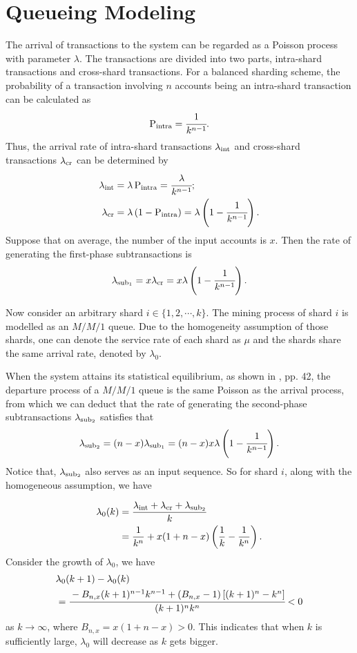 
\section*{Queueing Modeling}

The arrival of transactions to the system can be regarded as a Poisson process with parameter \(\lambda\). 
The transactions are divided into two parts, intra-shard transactions and cross-shard transactions. 
For a balanced sharding scheme, the probability of a transaction involving $n$ accounts being an intra-shard transaction can be calculated as 
\[\operatorname{P}_{\rm intra} = \cfrac{1}{k^{n-1}}.\]
Thus, the arrival rate of intra-shard transactions \(\lambda_{\rm int}\) and cross-shard transactions \(\lambda_{\rm cr}\)
can be determined by 
\begin{align*}
    \lambda_{\rm int} &= \lambda \operatorname{P}_{\rm intra} = \cfrac{\lambda}{k^{n-1}}; \\
    \lambda_{\rm cr} &= \lambda \left(1- \operatorname{P}_{\rm intra}\right) = \lambda\left(1-\cfrac{1}{k^{n-1}}\right).
\end{align*}
Suppose that on average, the number of the input accounts is $x$. Then the rate of generating the first-phase subtransactions is
\[\lambda_{\rm sub_1} = x \lambda_{\rm cr} = x \lambda\left(1-\cfrac{1}{k^{n-1}}\right).\]

Now consider an arbitrary shard $i \in \{1,2,\cdots ,k\}$. 
The mining process of shard $i$ is modelled as an $M/M/1$ queue.
Due to the homogeneity assumption of those shards, one can denote the service rate of each shard as $\mu$ and 
the shards share the same arrival rate, denoted by $\lambda_0$.

When the system attains its statistical equilibrium, as shown in \cite{bhat2008IntroductionQueueingTheory}, pp. 42, the
departure process of a $M/M/1$ queue is the same Poisson as the arrival process, from which we can deduct that
the rate of generating the second-phase subtransactions $\lambda_{\rm sub_2}$ satisfies that
\[\lambda_{\rm sub_2} = (n-x) \lambda_{\rm sub_1} = (n-x)x \lambda\left(1-\cfrac{1}{k^{n-1}}\right).\]
Notice that, $\lambda_{\rm sub_2}$ also serves as an input sequence. 
So for shard $i$, along with the homogeneous assumption, we have 

\begin{align*}
    \lambda_0(k) &= \frac{\lambda_{\rm int} + \lambda_{\rm cr}+ \lambda_{\rm sub_2}}{k} \\ &= \frac{1}{k^n}+x(1+n-x)\left(\frac{1}{k}-\frac{1}{k^n}\right).
\end{align*}
Consider the growth of $\lambda_0$, we have
\begin{align*}
    &\lambda_0(k+1)-\lambda_0(k)  \\ &= \cfrac{-B_{n,x}(k+1)^{n-1}k^{n-1}+(B_{n,x}-1)\left[(k+1)^n-k^n\right]}{(k+1)^nk^n} < 0 
\end{align*}
as $k\to \infty$, where $B_{n,x}=x(1+n-x)>0$. This indicates that when $k$ is sufficiently large, $\lambda_0$ will decrease as $k$ gets bigger.


